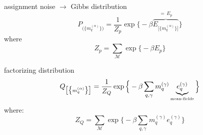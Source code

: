 
\begin{frame}[t] 
\begin{block}{assignment noise $\rightarrow$ Gibbs distribution}
$$
	P_{ \big( \big\{ m_q^{(\alpha)} \big\} \big) }
	= \frac{1}{Z_p} \exp \Big\{ -\beta 
	\overbrace{
		E_{\big[ \big\{ m_q^{(\alpha)} \big\} \big]}
		}^{= \, E_p}
		\Big\}
$$
where
$$
	Z_p = \sum\limits_{\mathscr{M}} \exp \Big\{ -\beta
		E_p
		\Big\}
$$
\end{block}
\begin{block}{factorizing distribution}
$$
	Q_{ \big[ \big\{ m_q^{(\alpha)} \big\} \big] }
	= \frac{1}{Z_Q} \exp \Big\{ -\beta \sum\limits_{q, \gamma}
		m_q^{(\gamma)} \underbrace{ e_q^{(\gamma)} }_{
			\text{{\tiny mean-fields}} } \Big\}
$$
where:
$$
	Z_Q = \sum\limits_{\mathscr{M}} \exp \Big\{ -\beta \sum\limits_{q, 
		\gamma} m_q^{(\gamma)} e_q^{(\gamma)} \Big\}
$$
\end{block}
\end{frame}

